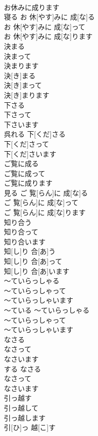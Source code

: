 \documentclass[8pt]{extreport}
\begin{document}
\begin{CJK}{UTF8}{min}
\\	お休みに成ります	
\\	寝る	お 休[やす]みに 成[な]る 
\\	お 休[やす]みに 成[な]って 
\\	お 休[やす]みに 成[な]ります	
\\	決まる 
\\	決まって 
\\	決まります	
\\	決[き]まる 
\\	決[き]まって 
\\	決[き]まります	
\\	下さる 
\\	下さって 
\\	下さいます	
\\	呉れる	下[くだ]さる 
\\	下[くだ]さって 
\\	下[くだ]さいます	
\\	ご覧に成る 
\\	ご覧に成って 
\\	ご覧に成ります	
\\	見る	ご 覧[らん]に 成[な]る 
\\	ご 覧[らん]に 成[な]って 
\\	ご 覧[らん]に 成[な]ります	
\\	知り合う 
\\	知り合って 
\\	知り合います	
\\	知[し]り 合[あ]う 
\\	知[し]り 合[あ]って 
\\	知[し]り 合[あ]います	
\\	〜ていらっしゃる 
\\	〜ていらっしゃって 
\\	〜ていらっしゃいます	
\\	〜ている	〜ていらっしゃる 
\\	〜ていらっしゃって 
\\	〜ていらっしゃいます	
\\	なさる 
\\	なさって 
\\	なさいます	
\\	する	なさる 
\\	なさって 
\\	なさいます	
\\	引っ越す 
\\	引っ越して 
\\	引っ越します	
\\	引[ひ]っ 越[こ]す 

\end{CJK}
\end{document}
